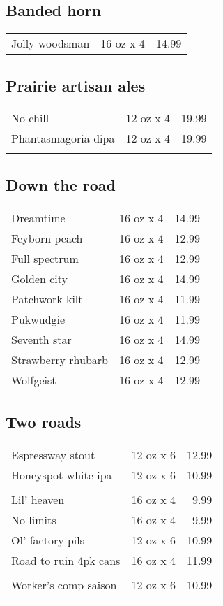 \documentclass{article}%
\begin{document}
\begin{multicols}{3}
%
\subsection*{Banded horn}%
\begin{tabular}{l c r}%
Jolly woodsman&16 oz x 4&14.99\\%
\end{tabular}

%
\subsection*{Prairie artisan ales}%
\begin{tabular}{l c r}%
No chill&12 oz x 4&19.99\\%
\multirow{1}{15ex}{Phantasmagoria dipa}&12 oz x 4&19.99\\%
&&\\%
\end{tabular}

%
\subsection*{Down the road}%
\begin{tabular}{l c r}%
Dreamtime&16 oz x 4&14.99\\%
Feyborn peach&16 oz x 4&12.99\\%
Full spectrum&16 oz x 4&12.99\\%
Golden city&16 oz x 4&14.99\\%
Patchwork kilt&16 oz x 4&11.99\\%
Pukwudgie&16 oz x 4&11.99\\%
Seventh star&16 oz x 4&14.99\\%
Strawberry rhubarb&16 oz x 4&12.99\\%
Wolfgeist&16 oz x 4&12.99\\%
\end{tabular}

%
\subsection*{Two roads}%
\begin{tabular}{l c r}%
Espressway stout&12 oz x 6&12.99\\%
\multirow{1}{15ex}{Honeyspot white ipa}&12 oz x 6&10.99\\%
&&\\%
Lil' heaven&16 oz x 4&9.99\\%
No limits&16 oz x 4&9.99\\%
Ol' factory pils&12 oz x 6&10.99\\%
\multirow{1}{15ex}{Road to ruin 4pk cans}&16 oz x 4&11.99\\%
&&\\%
\multirow{1}{15ex}{Worker's comp saison}&12 oz x 6&10.99\\%
&&\\%
\end{tabular}


\end{multicols}
\end{document}

